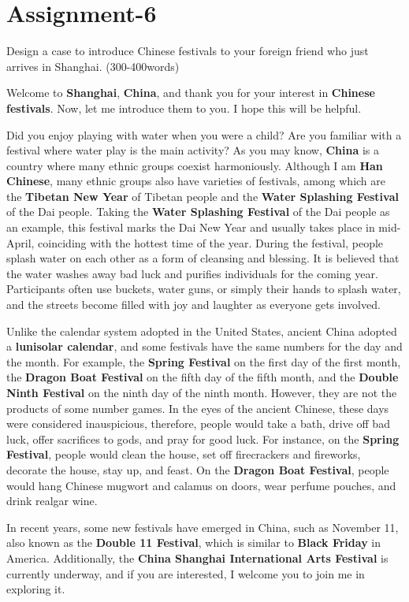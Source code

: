 \section{Assignment-6}

\begin{question}{}{}
    Design a case to introduce Chinese festivals to your foreign friend who just arrives in Shanghai. (300-400words)
\end{question}

Welcome to \textbf{Shanghai}, \textbf{China}, and thank you for your interest in \textbf{Chinese festivals}. Now, let me introduce them to you. I hope this will be helpful.

Did you enjoy playing with water when you were a child? Are you familiar with a festival where water play is the main activity? As you may know, \textbf{China} is a country where many ethnic groups coexist harmoniously. Although I am \textbf{Han Chinese}, many ethnic groups also have varieties of festivals, among which are the \textbf{Tibetan New Year} of Tibetan people and the \textbf{Water Splashing Festival} of the Dai people. Taking the \textbf{Water Splashing Festival} of the Dai people as an example, this festival marks the Dai New Year and usually takes place in mid-April, coinciding with the hottest time of the year. During the festival, people splash water on each other as a form of cleansing and blessing. It is believed that the water washes away bad luck and purifies individuals for the coming year. Participants often use buckets, water guns, or simply their hands to splash water, and the streets become filled with joy and laughter as everyone gets involved.

Unlike the calendar system adopted in the United States, ancient China adopted a \textbf{lunisolar calendar}, and some festivals have the same numbers for the day and the month. For example, the \textbf{Spring Festival} on the first day of the first month, the \textbf{Dragon Boat Festival} on the fifth day of the fifth month, and the \textbf{Double Ninth Festival} on the ninth day of the ninth month. However, they are not the products of some number games. In the eyes of the ancient Chinese, these days were considered inauspicious, therefore, people would take a bath, drive off bad luck, offer sacrifices to gods, and pray for good luck. For instance, on the \textbf{Spring Festival}, people would clean the house, set off firecrackers and fireworks, decorate the house, stay up, and feast. On the \textbf{Dragon Boat Festival}, people would hang Chinese mugwort and calamus on doors, wear perfume pouches, and drink realgar wine.

In recent years, some new festivals have emerged in China, such as November 11, also known as the \textbf{Double 11 Festival}, which is similar to \textbf{Black Friday} in America. Additionally, the \textbf{China Shanghai International Arts Festival} is currently underway, and if you are interested, I welcome you to join me in exploring it.
